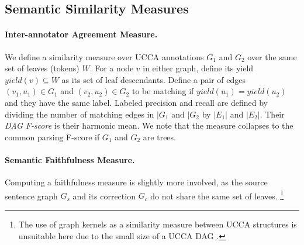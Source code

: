 \documentclass[letter,11pt]{article}
\begin{document}
\subsection{Semantic Similarity Measures}

\paragraph{Inter-annotator Agreement Measure.} We define a similarity measure over UCCA annotations 
$G_1$ and $G_2$ over the same set of leaves (tokens) $W$.
For a node $v$ in either graph, define its yield $yield(v) \subseteq W$ as its
set of leaf descendants.
Define a pair of edges $(v_1,u_1) \in G_1$ and $(v_2,u_2) \in G_2$ to be matching
if $yield(u_1) = yield(u_2)$ and they have the same label.
Labeled precision and recall are defined by dividing the number of matching edges
in $|G_1$ and $|G_2$ by $|E_1|$ and $|E_2|$. Their {\it DAG F-score} is their harmonic mean.
We note that the measure collapses to the common parsing F-score if $G_1$ and $G_2$ are trees.

\paragraph{Semantic Faithfulness Measure.} Computing a faithfulness
measure is slightly more involved, as the source sentence graph $G_s$ and its
correction $G_c$ do not share the same set of leaves.
\footnote{The use of graph kernels as a similarity measure between UCCA 
  structures is unsuitable here due to the small size of a UCCA DAG \cite{kashima2003marginalized}.} 


\end{document}
